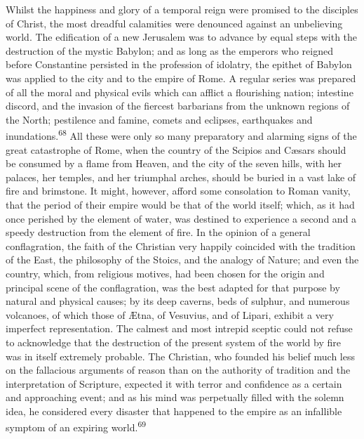 Whilst the happiness and glory of a temporal reign were promised
to the disciples of Christ, the most dreadful calamities were
denounced against an unbelieving world. The edification of a new
Jerusalem was to advance by equal steps with the destruction of
the mystic Babylon; and as long as the emperors who reigned
before Constantine persisted in the profession of idolatry, the
epithet of Babylon was applied to the city and to the empire of
Rome. A regular series was prepared of all the moral and physical
evils which can afflict a flourishing nation; intestine discord,
and the invasion of the fiercest barbarians from the unknown
regions of the North; pestilence and famine, comets and eclipses,
earthquakes and inundations.\textsuperscript{68} All these were only so many
preparatory and alarming signs of the great catastrophe of Rome,
when the country of the Scipios and Cæsars should be consumed by
a flame from Heaven, and the city of the seven hills, with her
palaces, her temples, and her triumphal arches, should be buried
in a vast lake of fire and brimstone. It might, however, afford
some consolation to Roman vanity, that the period of their empire
would be that of the world itself; which, as it had once perished
by the element of water, was destined to experience a second and
a speedy destruction from the element of fire. In the opinion of
a general conflagration, the faith of the Christian very happily
coincided with the tradition of the East, the philosophy of the
Stoics, and the analogy of Nature; and even the country, which,
from religious motives, had been chosen for the origin and
principal scene of the conflagration, was the best adapted for
that purpose by natural and physical causes; by its deep caverns,
beds of sulphur, and numerous volcanoes, of which those of Ætna,
of Vesuvius, and of Lipari, exhibit a very imperfect
representation. The calmest and most intrepid sceptic could not
refuse to acknowledge that the destruction of the present system
of the world by fire was in itself extremely probable. The
Christian, who founded his belief much less on the fallacious
arguments of reason than on the authority of tradition and the
interpretation of Scripture, expected it with terror and
confidence as a certain and approaching event; and as his mind
was perpetually filled with the solemn idea, he considered every
disaster that happened to the empire as an infallible symptom of
an expiring world.\textsuperscript{69}


